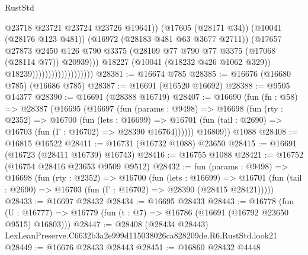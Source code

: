 \begin{lexlean}{RustStd}
\begin{coremodule}
                                                @23718
                                                @23721
                                                @23724
                                                @23726
                                                @19641))
                                            (@17605 (@28171 @34))
                                            (@10041 (@28176 @123 @481))
                                            (@16972 (@28183 @481 @63 @3677 @2711))
                                            (@17657
                                              @27873
                                              @2450
                                              @126
                                              @790
                                              @3375
                                              (@28109
                                                @77
                                                @790
                                                @77
                                                @3375
                                                (@17068 (@28114 @77))
                                                @20939)))
                                          @18227
                                          (@10041 (@18232 @426 @1062 @329))
                                          @18239)))))))))))))))))))
@28381 := @16674 @785
@28385 := @16676 (@16680 @785) (@16686 @785)
@28387 := @16691 (@16520 @16692)
@28388 := @9505 @14377
@28390 := @16691 (@28388 @16719)
@28407 := @16690
    (fun (fn : @58) =>
    @28387
      (@16695
        (@16697
          (fun (params : @9498) =>
          @16698
            (fun (rty : @2352) =>
            @16700
              (fun (lets : @16699) =>
              @16701 (fun (tail : @2690) => @16703 (fun (Γ : @16702) => @28390 @16764))))))
        @16809))
    @1088
@28408 := @16815 @16522
@28411 := @16731 (@16732 @1088) @23650
@28415 := @16691 (@16723 (@28411 @16739) @16743)
@28416 := @16755 @1088
@28421 := @16752 (@16754 @28416 @23653 @9509 @9512)
@28432 := fun (params : @9498) =>
  @16698
    (fun (rty : @2352) =>
    @16700
      (fun (lets : @16699) =>
      @16701 (fun (tail : @2690) => @16703 (fun (Γ : @16702) => @28390 (@28415 @28421)))))
@28433 := @16697 @28432
@28434 := @16695 @28433
@28443 := @16778
    (fun (U : @16777) => @16779 (fun (t : @7) => @16786 (@16691 (@16792 @23650 @9515) @16803)))
@28447 := @28408 (@28434 @28443) LexLeanPreserve.C6632b3a2e999d115038026ca828209de.R6.RustStd.look21
@28449 := @16676 @28433 @28443
@28451 := @16860 @28432 @4448

\end{coremodule}
\end{lexlean}
